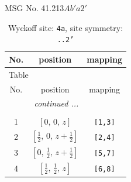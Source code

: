 \documentclass[fleqn,8pt]{jsarticle}
\begin{document}
\setcounter{MaxMatrixCols}{32}

\renewcommand{\tablename}{Table~}
\renewcommand{\figurename}{Figure~}
\begin{center}
\LARGE
MSG No. 41.213\quad$Ab'a2'$
\end{center}
\renewcommand{\arraystretch}{1.2}
\begin{longtable}{ccc}
\caption{Wyckoff site: {\tt 4a}, site symmetry: {\tt ..2'}}
 \\
 \hline \hline
No. & position & mapping \\ \hline \endfirsthead

\multicolumn{2}{l}{\tablename\ \thetable{}} \\
 \hline \hline
No. & position & mapping \\ \hline \endhead

 \hline \hline
\multicolumn{2}{r}{\footnotesize\it continued ...} \\ \endfoot

 \hline \hline
\multicolumn{2}{r}{} \\ \endlastfoot

1 & $\left[ 0,\, 0,\, z \right]$ & {\tt [1,3]} \\ \hline
2 & $\left[ \frac{1}{2},\, 0,\, z + \frac{1}{2} \right]$ & {\tt [2,4]} \\ \hline
3 & $\left[ 0,\, \frac{1}{2},\, z + \frac{1}{2} \right]$ & {\tt [5,7]} \\ \hline
4 & $\left[ \frac{1}{2},\, \frac{1}{2},\, z \right]$ & {\tt [6,8]} \\
\end{longtable}
\renewcommand{\arraystretch}{1.2}
\end{document}
